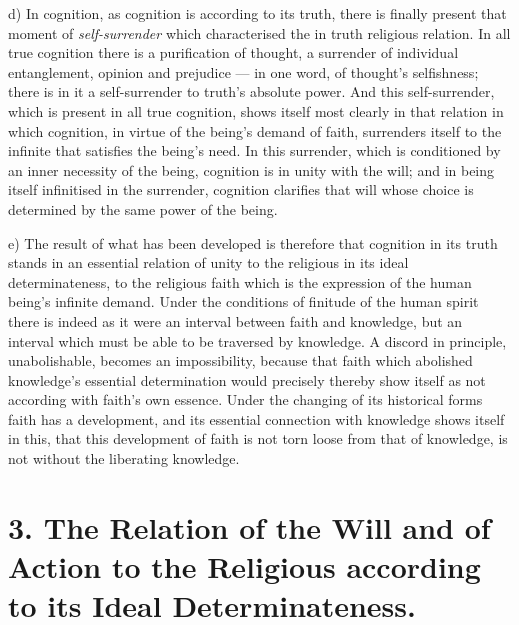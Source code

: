 \documentclass[12pt,a4paper]{book}
\begin{document}
d) In cognition, as cognition is according to its truth, there is finally
present that moment of \emph{self-surrender} which characterised the in truth
religious relation. In all true cognition there is a purification of thought,
a surrender of individual
entanglement, opinion and prejudice --- in one word, of thought's selfishness;
there is in it a self-surrender to truth's absolute power. And this
self-surrender, which is present in all true cognition, shows itself most
clearly in that relation in which cognition, in virtue of the being's demand
of faith, surrenders itself to the infinite that satisfies the being's need.
In this surrender, which is conditioned by an inner necessity of the being,
cognition is in unity with the will; and in being itself infinitised in the
surrender, cognition clarifies that will whose choice is determined by the
same power of the being.

e) The result of what has been developed is therefore that cognition in its
truth stands in an essential relation of unity to the religious in its ideal
determinateness, to the religious faith which is the expression of the human
being's infinite demand. Under the conditions of finitude of the human spirit
there is indeed as it were an interval between faith and knowledge, but an
interval which must be able to be traversed by knowledge. A discord in
principle, unabolishable, becomes an impossibility, because that faith which
abolished knowledge's essential determination would precisely thereby show
itself as not according with faith's own essence. Under the changing of its
historical forms faith has a development, and its essential connection with
knowledge shows itself in this, that this development of faith is not torn
loose from that of knowledge, is not without the liberating knowledge.

\section*{3. The Relation of the Will and of Action to the Religious according to its Ideal Determinateness.}
\end{document}

